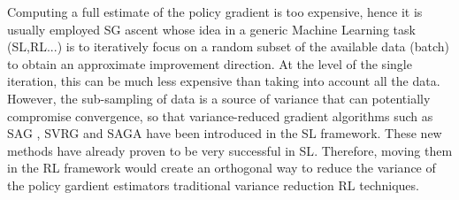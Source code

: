 Computing a full estimate of the policy gradient is too expensive, hence it is usually employed \acf{SG} ascent \citep{nesterov2013introductory} whose idea in a generic Machine Learning task (\acs{SL},\acs{RL}...) is to iteratively focus on a random subset of the available data (batch) to obtain an approximate improvement direction. At the level of the single iteration, this can be much less expensive than taking into account all the data.
However, the sub-sampling of data is a source of variance that can potentially compromise convergence, so that variance-reduced gradient algorithms such as \acf{SAG} \citep{roux2012stochastic}, \acf{SVRG} \citep{allen2016variance} and \acf{SAGA} \citep{defazio2014saga} have been introduced in the \acs{SL} framework. These new methods have already proven to be very successful in \acs{SL}. Therefore, moving them in the \acs{RL} framework would create an orthogonal way to reduce the variance of the policy gardient estimators \wrt traditional variance reduction \acs{RL} techniques.
